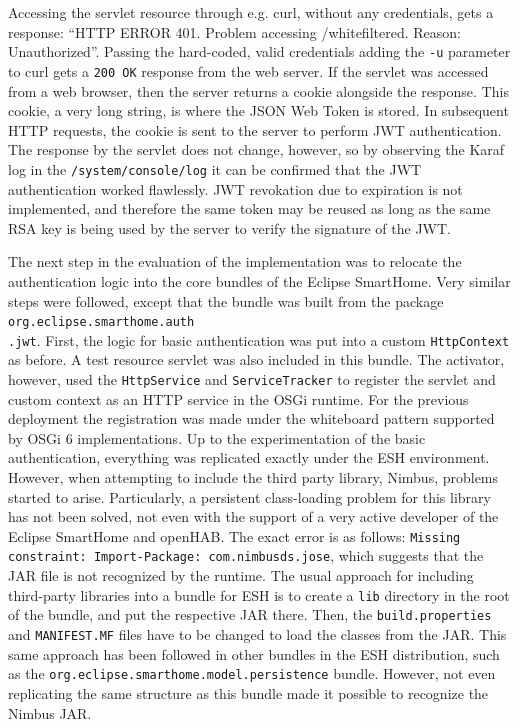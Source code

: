 \documentclass[12pt]{article}
\begin{document}
Accessing the servlet resource through e.g. curl, without any credentials, gets a response: ``HTTP ERROR 401. Problem accessing /whitefiltered. Reason: Unauthorized''. Passing the hard-coded, valid credentials adding the \texttt{-u} parameter to curl gets a \texttt{200 OK} response from the web server. If the servlet was accessed from a web browser, then the server returns a cookie alongside the response. This cookie, a very long string, is where the JSON Web Token is stored. In subsequent HTTP requests, the cookie is sent to the server to perform JWT authentication. The response by the servlet does not change, however, so by observing the Karaf log in the \texttt{/system/console/log} it can be confirmed that the JWT authentication worked flawlessly. JWT revokation due to expiration is not implemented, and therefore the same token may be reused as long as the same RSA key is being used by the server to verify the signature of the JWT.

The next step in the evaluation of the implementation was to relocate the authentication logic into the core bundles of the Eclipse SmartHome. Very similar steps were followed, except that the bundle was built from the package \texttt{org.eclipse.smarthome.auth\\.jwt}. First, the logic for basic authentication was put into a custom \texttt{HttpContext} as before. A test resource servlet was also included in this bundle. The activator, however, used the \texttt{HttpService} and \texttt{ServiceTracker} to register the servlet and custom context as an HTTP service in the OSGi runtime. For the previous deployment the registration was made under the whiteboard pattern supported by OSGi 6 implementations. Up to the experimentation of the basic authentication, everything was replicated exactly under the ESH environment. However, when attempting to include the third party library, Nimbus, problems started to arise. Particularly, a persistent class-loading problem for this library has not been solved, not even with the support of a very active developer of the Eclipse SmartHome and openHAB. The exact error is as follows: \texttt{Missing constraint: Import-Package: com.nimbusds.jose}, which suggests that the JAR file is not recognized by the runtime. The usual approach for including third-party libraries into a bundle for ESH is to create a \texttt{lib} directory in the root of the bundle, and put the respective JAR there. Then, the \texttt{build.properties} and \texttt{MANIFEST.MF} files have to be changed to load the classes from the JAR. This same approach has been followed in other bundles in the ESH distribution, such as the \texttt{org.eclipse.smarthome.model.persistence} bundle. However, not even replicating the same structure as this bundle made it possible to recognize the Nimbus JAR.
\end{document}
